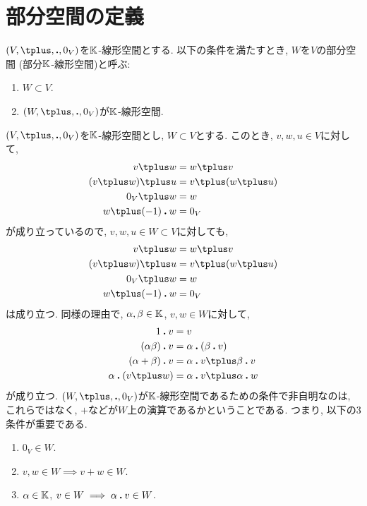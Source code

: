 \section{部分空間の定義}
\begin{definition}
  $(V,\plus,\act,0_V)$を$\mathbb{K}$-線形空間とする.
  以下の条件を満たすとき,
  $W$を$V$の部分空間 (部分$\mathbb{K}$-線形空間)と呼ぶ:
  \begin{enumerate}
  \item $W\subset V$.
  \item $(W,\plus,\act,0_V)$が$\mathbb{K}$-線形空間.
  \end{enumerate}
\end{definition}
\begin{remark}
  $(V,\plus,\act,0_V)$を$\mathbb{K}$-線形空間とし, $W\subset V$とする.
このとき, $v,w,u\in V$に対して,
\begin{align*}
  v\plus w&=w\plus v\\
  (v\plus w)\plus u&=v\plus (w\plus u)\\
  0_V\plus w&=w\\
  w\plus (-1)\act w&=0_V
\end{align*}
が成り立っているので,
$v,w,u\in W\subset V$に対しても,
\begin{align*}
  v\plus w&=w\plus v\\
  (v\plus w)\plus u&=v\plus (w\plus u)\\
  0_V\plus w&=w\\
  w\plus (-1)\act w&=0_V
\end{align*}
は成り立つ.
同様の理由で,
$\alpha,\beta\in \mathbb{K}$, $v,w\in W$に対して,
\begin{align*}
  1\act v&=v\\
  (\alpha\beta)\act v&=\alpha\act(\beta\act v)\\
  (\alpha+\beta)\act v&=\alpha\act v\plus \beta\act v\\
  \alpha\act(v\plus w)&=\alpha\act v\plus \alpha\act w
\end{align*}
が成り立つ.
$(W,\plus ,\act,0_V)$が$\mathbb{K}$-線形空間であるための条件で非自明なのは,
これらではなく, $\plus $などが$W$上の演算であるかということである.
つまり, 以下の$3$条件が重要である.
\begin{enumerate}
  \item $0_V\in W$.
  \item $v,w\in W \implies v\plus w\in W$.
  \item $\alpha\in\mathbb{K}$, $v\in W \implies \alpha\mathbin{\boldsymbol{.}} v\in W$.
\end{enumerate}
\end{remark}
